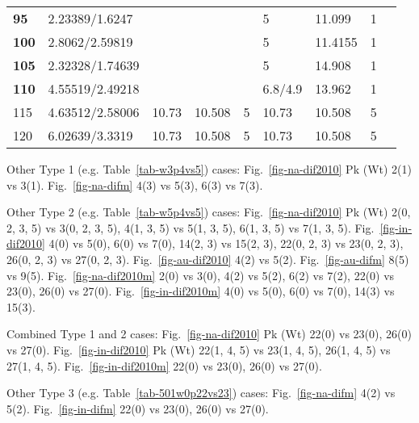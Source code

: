 \begin{table*}
\begin{tabular}{|l|l|l|l|l|l|l|l|l|l}
\textbf{95} & 2.23389/1.6247 & \multicolumn{3}{l|}{} & 5 & 11.099 & 1 & \multicolumn{2}{l|}{} \\ \cline{1-2} \cline{6-8}
\textbf{100} & 2.8062/2.59819 & \multicolumn{3}{l|}{} & 5 & 11.4155 & 1 & \multicolumn{2}{l|}{} \\ \cline{1-2} \cline{6-8}
\textbf{105} & 2.32328/1.74639 & \multicolumn{3}{l|}{} & 5 & 14.908 & 1 & \multicolumn{2}{l|}{} \\ \cline{1-2} \cline{6-8}
\textbf{110} & 4.55519/2.49218 & \multicolumn{3}{l|}{} & 6.8/4.9 & 13.962 & 1 & \multicolumn{2}{l|}{} \\ \cline{1-8}
115 & 4.63512/2.58006 & 10.73 & 10.508 & 5 & 10.73 & 10.508 & 5 & \multicolumn{2}{l|}{} \\ \cline{1-8}
120 & 6.02639/3.3319 & 10.73 & 10.508 & 5 & 10.73 & 10.508 & 5 & \multicolumn{2}{l|}{} \\ \cline{1-8}
\end{tabular}
\end{table*}

Other Type 1 (e.g. Table~\ref{tab-w3p4vs5}) cases: Fig.~\ref{fig-na-dif2010}
Pk (Wt) 2(1) vs 3(1). Fig.~\ref{fig-na-difm} 4(3) vs 5(3), 6(3) vs 7(3).

Other Type 2 (e.g. Table~\ref{tab-w5p4vs5}) cases: Fig.~\ref{fig-na-dif2010}
Pk (Wt) 2(0, 2, 3, 5) vs 3(0, 2, 3, 5), 4(1, 3, 5) vs 5(1, 3, 5), 6(1, 3, 5) vs
7(1, 3, 5). Fig.~\ref{fig-in-dif2010} 4(0) vs 5(0),
6(0) vs 7(0), 14(2, 3) vs 15(2, 3), 22(0, 2, 3) vs 23(0, 2, 3),
26(0, 2, 3) vs 27(0, 2, 3). Fig.~\ref{fig-au-dif2010} 4(2) vs 5(2).
Fig.~\ref{fig-au-difm} 8(5) vs 9(5). Fig.~\ref{fig-na-dif2010m} 2(0)
vs 3(0), 4(2) vs 5(2), 6(2) vs 7(2), 22(0) vs
23(0), 26(0) vs 27(0).
Fig.~\ref{fig-in-dif2010m} 4(0) vs 5(0), 6(0)
vs 7(0), 14(3) vs 15(3).

Combined Type 1 and 2 cases: Fig.~\ref{fig-na-dif2010} Pk (Wt)
22(0) vs 23(0), 26(0) vs 27(0).
Fig.~\ref{fig-in-dif2010} Pk (Wt) 22(1, 4, 5) vs 23(1, 4, 5), 26(1, 4, 5) vs
27(1, 4, 5). Fig.~\ref{fig-in-dif2010m} 22(0) vs 23(0),
26(0) vs 27(0).

Other Type 3 (e.g. Table~\ref{tab-501w0p22vs23}) cases: Fig.~\ref{fig-na-difm}
4(2) vs 5(2). Fig.~\ref{fig-in-difm} 22(0)
vs 23(0), 26(0) vs 27(0).


